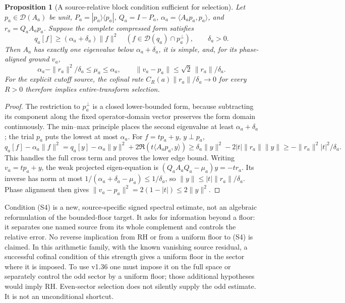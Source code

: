 \documentclass[11pt]{article}
\newtheorem{proposition}[theorem]{Proposition}
\theoremstyle{remark}
\begin{document}
\begin{proposition}[A source-relative block condition sufficient for selection]
\label{prop:ns43-ccm-source-separation}
Let $p_a\in\mathcal D(A_a)$ be unit, $P_a=|p_a\rangle\langle p_a|$,
$Q_a=I-P_a$, $\alpha_a=\langle A_ap_a,p_a\rangle$, and
$r_a=Q_aA_ap_a$. Suppose the \emph{complete compressed form} satisfies
\[
 q_a[f]\ge(\alpha_a+\delta_a)\|f\|^2
 \quad(f\in\mathcal D(q_a)\cap p_a^\perp),\qquad \delta_a>0.
 \tag{S4}
\]
Then $A_a$ has exactly one eigenvalue below $\alpha_a+\delta_a$,
it is simple, and, for its phase-aligned ground $v_a$,
\[
 \alpha_a-\|r_a\|^2/\delta_a\le\mu_a\le\alpha_a,
 \qquad \|v_a-p_a\|\le\sqrt2\,\|r_a\|/\delta_a.
\]
For the explicit cutoff source, the cofinal rate
$C_R(a)\|r_a\|/\delta_a\to0$ for every $R>0$ therefore implies
entire-transform selection.
\end{proposition}
\begin{proof}
The restriction to $p_a^\perp$ is a closed lower-bounded form,
because subtracting its component along the fixed operator-domain
vector preserves the form domain continuously. The min--max principle
places the second eigenvalue at least $\alpha_a+\delta_a$; the trial
$p_a$ puts the lowest at most $\alpha_a$. For $f=tp_a+y$, $y\perp p_a$,
\[
 q_a[f]-\alpha_a\|f\|^2
 =q_a[y]-\alpha_a\|y\|^2+2\Re(t\langle A_ap_a,y\rangle)
 \ge\delta_a\|y\|^2-2|t|\|r_a\|\|y\|
 \ge-\|r_a\|^2|t|^2/\delta_a.
\]
This handles the full cross term and proves the lower edge bound.
Writing $v_a=tp_a+y$, the weak projected eigen-equation is
$(Q_aA_aQ_a-\mu_a)y=-tr_a$. Its inverse has norm at most
$1/(\alpha_a+\delta_a-\mu_a)\le1/\delta_a$, so
$\|y\|\le|t|\|r_a\|/\delta_a$. Phase alignment then gives
$\|v_a-p_a\|^2=2(1-|t|)\le2\|y\|^2$.
\end{proof}
Condition (S4) is a new, source-specific signed spectral estimate,
not an algebraic reformulation of the bounded-floor target. It asks for information beyond a floor: it separates one named source
from its whole complement and controls the relative error. No reverse
implication from RH or from a uniform floor to (S4) is claimed. In this
arithmetic family, with the known vanishing source residual, a successful
cofinal condition of this strength gives a uniform floor in the sector
where it is imposed. To use v1.36 one must impose it on the full space
or separately control the odd sector by a uniform floor; those additional
hypotheses would imply RH. Even-sector selection does not silently supply
the odd estimate. It is not an unconditional shortcut.
\end{document}
